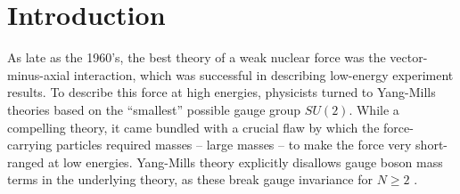 \documentclass[%
 reprint,
nofootinbib,
 amsmath,amssymb,
 aps,
floatfix,
]{revtex4-1}
\begin{document}

\section{\label{sec:intro}Introduction}
As late as the 1960's, the best theory of a weak nuclear force was the vector-minus-axial interaction, which was successful in describing low-energy experiment results.
To describe this force at high energies, physicists turned to Yang-Mills theories based on the ``smallest'' possible gauge group $SU(2)$.
While a compelling theory, it came bundled with a crucial flaw by which the force-carrying particles required masses -- large masses -- to make the force very short-ranged at low energies.
Yang-Mills theory explicitly disallows gauge boson mass terms in the underlying theory, as these break gauge invariance for $N\geq 2$ \cite{sher89}.
\end{document}
